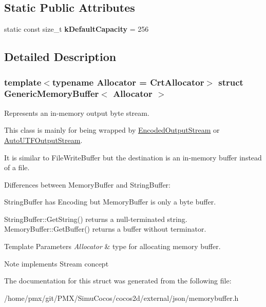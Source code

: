 \subsection*{Static Public Attributes}
\begin{DoxyCompactItemize}
\item 
\mbox{\label{structGenericMemoryBuffer_a5a89d73f383d75be07291190428970b1}} 
static const size\+\_\+t {\bfseries k\+Default\+Capacity} = 256
\end{DoxyCompactItemize}


\subsection{Detailed Description}
\subsubsection*{template$<$typename Allocator = Crt\+Allocator$>$\newline
struct Generic\+Memory\+Buffer$<$ Allocator $>$}

Represents an in-\/memory output byte stream. 

This class is mainly for being wrapped by \hyperlink{classEncodedOutputStream}{Encoded\+Output\+Stream} or \hyperlink{classAutoUTFOutputStream}{Auto\+U\+T\+F\+Output\+Stream}.

It is similar to File\+Write\+Buffer but the destination is an in-\/memory buffer instead of a file.

Differences between Memory\+Buffer and String\+Buffer\+:
\begin{DoxyEnumerate}
\item String\+Buffer has Encoding but Memory\+Buffer is only a byte buffer.
\item String\+Buffer\+::\+Get\+String() returns a null-\/terminated string. Memory\+Buffer\+::\+Get\+Buffer() returns a buffer without terminator.
\end{DoxyEnumerate}


\begin{DoxyTemplParams}{Template Parameters}
{\em Allocator} & type for allocating memory buffer. \\
\hline
\end{DoxyTemplParams}
\begin{DoxyNote}{Note}
implements Stream concept 
\end{DoxyNote}


The documentation for this struct was generated from the following file\+:\begin{DoxyCompactItemize}
\item 
/home/pmx/git/\+P\+M\+X/\+Simu\+Cocos/cocos2d/external/json/memorybuffer.\+h\end{DoxyCompactItemize}
